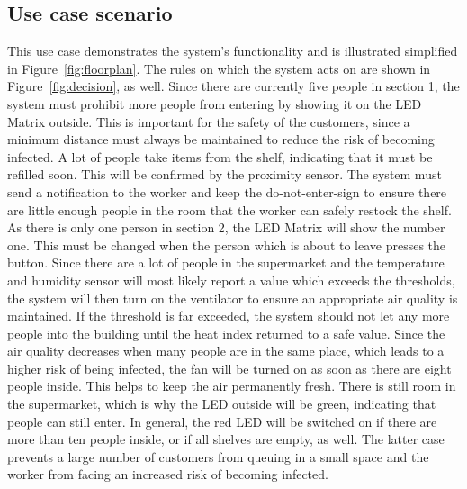 \documentclass[runningheads]{llncs}
\begin{document}
	\subsection{Use case scenario}
	This use case demonstrates the system's functionality and is illustrated simplified in Figure~\ref{fig:floorplan}.
	The rules on which the system acts on are shown in Figure~\ref{fig:decision}, as well.
	Since there are currently five people in section 1, the system must prohibit more people from entering by showing it on the LED Matrix outside. 
	This is important for the safety of the customers, since a minimum distance must always be maintained to reduce the risk of becoming infected. 
	A lot of people take items from the shelf, indicating that it must be refilled soon. 
	This will be confirmed by the proximity sensor. 
	The system must send a notification to the worker and keep the do-not-enter-sign to ensure there are little enough people in the room that the worker can safely restock the shelf.
	As there is only one person in section 2, the LED Matrix will show the number one. 
	This must be changed when the person which is about to leave presses the button. 
	Since there are a lot of people in the supermarket and the temperature and humidity sensor will most likely report a value which exceeds the thresholds, the system will then turn on the ventilator to ensure an appropriate air quality is maintained. 
	If the threshold is far exceeded, the system should not let any more people into the building until the heat index returned to a safe value.
	Since the air quality decreases when many people are in the same place, which leads to a higher risk of being infected, the fan will be turned on as soon as there are eight people inside. 
	This helps to keep the air permanently fresh. 
	There is still room in the supermarket, which is why the LED outside will be green, indicating that people can still enter.
	In general, the red LED will be switched on if there are more than ten people inside, or if all shelves are empty, as well. 
	The latter case prevents a large number of customers from queuing in a small space and the worker from facing an increased risk of becoming infected.
	
\end{document}
